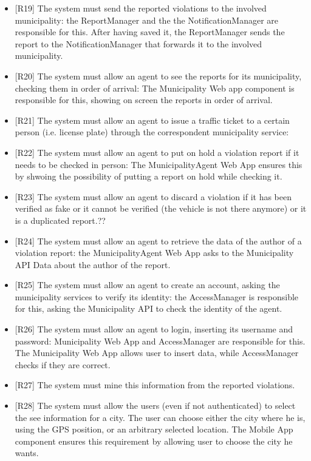 \documentclass[a4paper]{report}
\begin{document}
\begin{itemize}
\item {[R19]}	\label{R19}The system must send the reported violations to the involved municipality: the ReportManager and the the NotificationManager are responsible for this. After having saved it, the ReportManager sends the report to the NotificationManager that forwards it to the involved municipality.
\item {[R20]}   \label{R20}The system must allow an agent to see the reports for its municipality, checking them in order of arrival: The Municipality Web app component is responsible for this, showing on screen the reports in order of arrival.
\item {[R21]}	\label{R21}The system must allow an agent to issue a traffic ticket to a certain person (i.e. license plate) through the correspondent municipality service:
\item {[R22]}	\label{R22}The system must allow an agent to put on hold a violation report if it needs to be checked in person: The MunicipalityAgent Web App ensures this by shwoing the possibility of putting a report on hold while checking it.
\item {[R23]}	\label{R23}The system must allow an agent to discard a violation if it has been verified as fake or it cannot be verified (the vehicle is not there anymore) or it is a duplicated report.??
\item {[R24]}	\label{R24}The system must allow an agent to retrieve the data of the author of a violation report: the MunicipalityAgent Web App asks to the Municipality API Data about the author of the report. 
\item {[R25]}	\label{R25}The system must allow an agent to create an account, asking the municipality services to verify its identity: the AccessManager is responsible for this, asking the Municipality API to check the identity of the agent.
\item {[R26]}	\label{R26}The system must allow an agent to login, inserting its username and password: Municipality Web App and AccessManager are responsible for this. The Municipality Web App allows user to insert data, while AccessManager checks if they are correct.
\item {[R27]}	\label{R27}The system must mine this information from the reported violations.
\item {[R28]}	\label{R28}The system must allow the users (even if not authenticated) to select the see information for a city. The user can choose either the city where he is, using the GPS position, or an arbitrary selected location. The Mobile App component ensures this requirement by allowing user to choose the city he wants.

\end{itemize}
\end{document}
